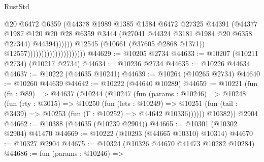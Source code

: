 \begin{lexlean}{RustStd}
\begin{coremodule}
                                                      @20
                                                      @6472
                                                      @6359
                                                      (@44378
                                                        @1989
                                                        @1385
                                                        @1584
                                                        @6472
                                                        @27325
                                                        @44391
                                                        (@44377
                                                          @1987
                                                          @120
                                                          @20
                                                          @28
                                                          @6359
                                                          @3444
                                                          (@27041
                                                            @44324
                                                            @3181
                                                            @1984
                                                            @20
                                                            @6358
                                                            @27344)
                                                          @44394))))))
                                              @12545
                                              (@10661 (@37605 @2868 @1371))
                                              @12557)))))))))))))))))))))
@44629 := @10205 @2734
@44633 := @10207 (@10211 @2734) (@10217 @2734)
@44634 := @10236 @2734
@44635 := @10226 @44634
@44637 := @10222 (@44635 @10241)
@44639 := @10264 (@10265 @2734)
@44640 := @10260 @44639
@44642 := @10222 (@44640 @10289)
@44659 := @10221
    (fun (fn : @89) =>
    @44637
      (@10244
        (@10247
          (fun (params : @10246) =>
          @10248
            (fun (rty : @3015) =>
            @10250
              (fun (lets : @10249) =>
              @10251 (fun (tail : @3439) => @10253 (fun (Γ : @10252) => @44642 @10336))))))
        @10382))
    @2904
@44662 := @10388 (@44635 (@10239 @2904))
@44665 := @10301 (@10302 @2904) @41470
@44669 := @10222 (@10293 (@44665 @10310) @10314)
@44670 := @10327 @2904
@44675 := @10324 (@10326 @44670 @41473 @10282 @10284)
@44686 := fun (params : @10246) =>

\end{coremodule}
\end{lexlean}

